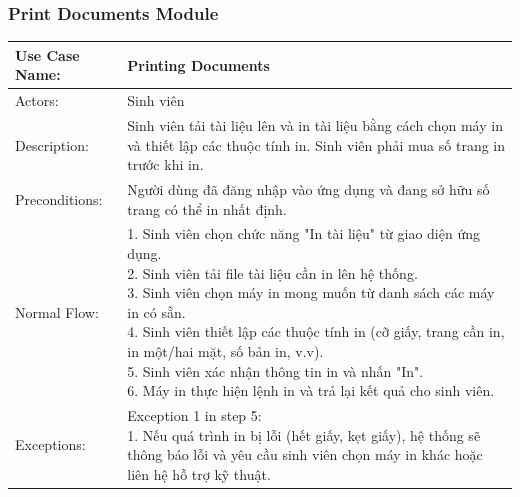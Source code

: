 \subsubsection{Print Documents Module}
\begin{table}[h!]
	\centering
	\begin{tabular}{ |p{4cm}|p{3cm}|p{3cm}|p{3cm}|  }
		\hline
		Use Case Name:    & \multicolumn{3}{l|}{Printing Documents}                                                                                   \\
		\hline
		Actors:           & \multicolumn{3}{p{10cm}|}{Sinh viên}                                                                                      \\
		\hline
		Description:      & \multicolumn{3}{p{10cm}|}{Sinh viên tải tài liệu lên và in tài liệu bằng cách chọn máy in và thiết lập các thuộc tính in.
		Sinh viên phải mua số trang in trước khi in.}                                                                                                 \\
		\hline
		Preconditions:    & \multicolumn{3}{p{10cm}|}{Người dùng đã đăng nhập vào ứng dụng và đang sở hữu số trang có thể in nhất định.}              \\
		\hline
		Normal Flow:      & \multicolumn{3}{p{10cm}|}{
			1. Sinh viên chọn chức năng "In tài liệu" từ giao diện ứng dụng.\newline
			2. Sinh viên tải file tài liệu cần in lên hệ thống.\newline
			3. Sinh viên chọn máy in mong muốn từ danh sách các máy in có sẵn.\newline
			4. Sinh viên thiết lập các thuộc tính in (cỡ giấy, trang cần in, in một/hai mặt, số bản in, v.v).\newline
			5. Sinh viên xác nhận thông tin in và nhấn "In".\newline
			6. Máy in thực hiện lệnh in và trả lại kết quả cho sinh viên.
		}                                                                                                                                             \\
		\hline
		Exceptions:       & \multicolumn{3}{p{10cm}|}{
			Exception 1 in step 5:\newline
			1. Nếu quá trình in bị lỗi (hết giấy, kẹt giấy), hệ thống sẽ thông báo lỗi và yêu cầu sinh viên chọn máy in khác hoặc liên hệ hỗ trợ kỹ thuật.
		}                                                                                                                                             \\

\end{tabular}
\end{table}
